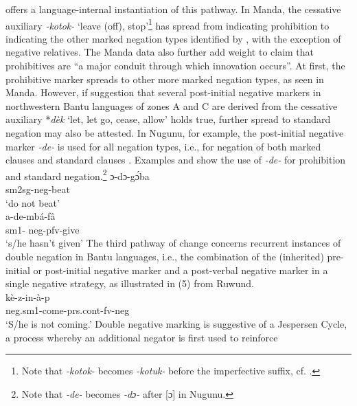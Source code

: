 \documentclass[output=paper]{langscibook}
\begin{document}
\citet{Bernander2017,Bernander2018} offers a language-internal
instantiation of this pathway. In Manda, the cessative auxiliary
\textit{-kotok-} `leave (off), stop’\footnote{Note that \textit{-kotok-}
becomes \textit{-kotuk-} before the imperfective suffix, cf.
.} has spread from indicating prohibition to indicating
the other marked negation types identified by
\citet{Guldemann1996,Guldemann1999}, with the exception of negative
relatives. The Manda data also further add weight to
 claim that prohibitives are ``a major conduit
through which innovation occurs''. At first, the prohibitive marker spreads
to other more marked negation types, as seen in Manda. However, if
 suggestion that several post-initial
negative markers in northwestern Bantu languages of zones A and C are
derived from the cessative auxiliary *\textit{d{\`e}k} `let, let go, cease,
allow' \citep{BastinCoupez2002} holds true, further spread to standard
negation may also be attested. In Nugunu, for example, the
post-initial negative marker \textit{-de-} is used for all negation types,
i.e., for negation of both marked clauses and standard clauses
\citep{Nurse2007}. Examples  and 
show the use of \textit{-de-} for prohibition and standard
negation.\footnote{Note that \textit{-de-} becomes \textit{-dɔ-} after [ɔ]
in Nugunu.} 
\ea\label{ex:nugunu-beat-give}
 \ea\label{ex:nugunu-beat}
\gll ɔ-dɔ-g{\'ɔ}ba\\ {\sc sm}2sg-{\sc neg}-beat\\ 
\glt `do not beat'\\
\ex\label{ex:nugunu-give} \gll a-de-mb{\'a}-f{\^a}\\ {\sc sm}1-{\sc
neg-pfv}-give\\ 
\glt `s/he hasn't given' \z\z 
%
The third pathway of change
concerns recurrent instances of double negation in Bantu languages, i.e.,
the combination of the (inherited) pre-initial or post-initial negative
marker and a post-verbal negative marker in a single negative strategy, as
illustrated in (5) from Ruwund. \ea\label{ex:ruwund:l53}
\\ \gll
k{\`e}-z-in-{\`a}-p\\ {\sc neg.sm}1-come-{\sc prs.cont-fv-neg}\\ \glt `S/he
is not coming.' \z Double negative marking is suggestive of a Jespersen
Cycle, a process whereby an additional negator is first used to reinforce
\end{document}
